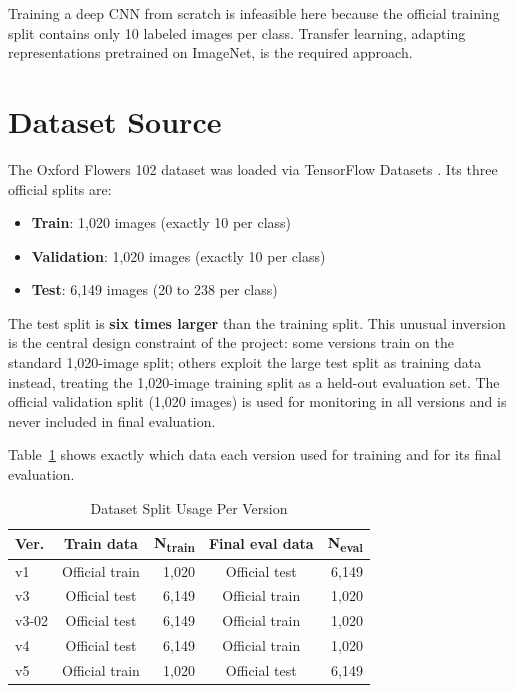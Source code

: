 \documentclass[conference]{IEEEtran}
\begin{document}
Training a deep CNN from scratch is infeasible here because the
official training split contains only 10 labeled images per class.
Transfer learning, adapting representations pretrained on ImageNet,
is the required approach.

\section{Dataset Source}

The Oxford Flowers 102 dataset \cite{nilsback2008} was loaded via
TensorFlow Datasets \cite{tfds}. Its three official splits are:

\begin{itemize}
  \item \textbf{Train}: 1,020 images (exactly 10 per class)
  \item \textbf{Validation}: 1,020 images (exactly 10 per class)
  \item \textbf{Test}: 6,149 images (20 to 238 per class)
\end{itemize}

The test split is \textbf{six times larger} than the training split.
This unusual inversion is the central design constraint of the project:
some versions train on the standard 1,020-image split; others exploit
the large test split as training data instead, treating the 1,020-image
training split as a held-out evaluation set. The official validation
split (1,020 images) is used for monitoring in all versions and is
never included in final evaluation.

Table~\ref{tab:splits} shows exactly which data each version used for
training and for its final evaluation.

\begin{table}[htbp]
  \caption{Dataset Split Usage Per Version}
  \begin{center}
  \begin{tabular}{l c r c r}
    \toprule
    \textbf{Ver.} & \textbf{Train data} & \textbf{N\textsubscript{train}}
      & \textbf{Final eval data} & \textbf{N\textsubscript{eval}} \\
    \midrule
    v1    & Official train & 1,020 & Official test  & 6,149 \\
    v3    & Official test  & 6,149 & Official train & 1,020 \\
    v3-02 & Official test  & 6,149 & Official train & 1,020 \\
    v4    & Official test  & 6,149 & Official train & 1,020 \\
    v5    & Official train & 1,020 & Official test  & 6,149 \\
    \bottomrule
  \end{tabular}
  \label{tab:splits}
  \end{center}
\end{table}
\end{document}
